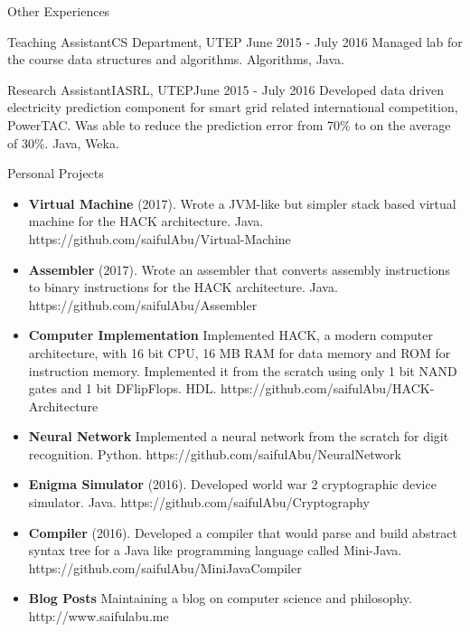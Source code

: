 \documentclass[]{mcdowellcv}
\begin{document}
	\begin{cvsection}{Other Experiences}
		\begin{cvsubsection}{Teaching Assistant}{CS Department, UTEP }{June 2015 - July 2016}
			Managed lab for the course data structures and algorithms. Algorithms, Java.
		\end{cvsubsection}
		\begin{cvsubsection}{Research Assistant}{IASRL, UTEP}{June 2015 - July 2016}
			Developed data driven electricity prediction component for smart grid related international competition, PowerTAC. Was able to reduce the prediction error from 70\% to on the average of 30\%. Java, Weka.
		\end{cvsubsection}
	\end{cvsection}
	
	\begin{cvsection}{Personal Projects}
		\begin{cvsubsection}{}{}{}
			\begin{itemize}
				\item \textbf{Virtual Machine} (2017). Wrote a JVM-like but simpler stack based virtual machine for the HACK architecture. Java. https://github.com/saifulAbu/Virtual-Machine 
				\item \textbf{Assembler} (2017). Wrote an assembler that converts assembly instructions to binary instructions for the HACK architecture. Java. https://github.com/saifulAbu/Assembler
				\item\textbf{Computer Implementation} Implemented HACK, a modern computer architecture, with 16 bit CPU, 16 MB RAM for data memory and ROM for instruction memory. Implemented it from the scratch using only 1 bit NAND gates and 1 bit DFlipFlops. HDL. https://github.com/saifulAbu/HACK-Architecture
				\item \textbf{Neural Network} Implemented a neural network from the scratch for digit recognition. Python. https://github.com/saifulAbu/NeuralNetwork 
				\item \textbf{Enigma Simulator} (2016).  Developed world war 2 cryptographic device simulator.  Java. https://github.com/saifulAbu/Cryptography
				\item \textbf{Compiler} (2016). Developed a compiler that would parse and build abstract syntax tree for a Java like programming language called Mini-Java. https://github.com/saifulAbu/MiniJavaCompiler
				\item \textbf{Blog Posts} Maintaining a blog on computer science and philosophy. http://www.saifulabu.me  
			\end{itemize}
		\end{cvsubsection}
	\end{cvsection}
	
\end{document}
